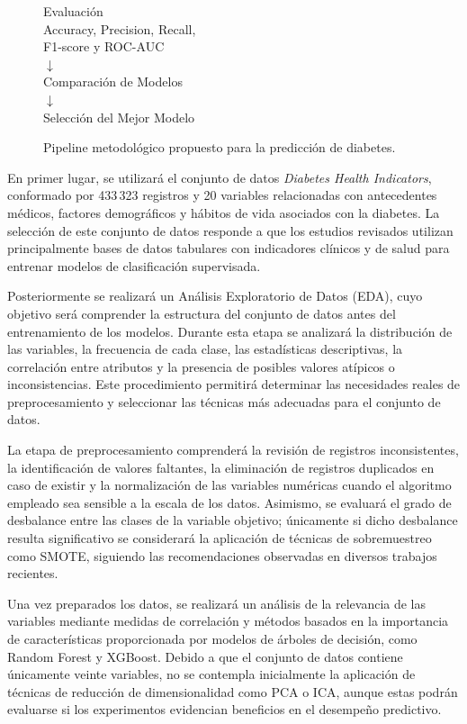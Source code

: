 \documentclass[journal]{IEEEtran}
\begin{document}
\begin{figure}[ht]
{\begin{minipage}{0.47\textwidth}
Evaluación\\
Accuracy, Precision, Recall,\\
F1-score y ROC-AUC\\
$\downarrow$\\[0.2cm]
 
Comparación de Modelos\\
$\downarrow$\\[0.2cm]
 
Selección del Mejor Modelo
\end{minipage}
}
\caption{Pipeline metodológico propuesto para la predicción de diabetes.}
\label{fig:pipeline}
\end{figure}

En primer lugar, se utilizará el conjunto de datos \textit{Diabetes Health Indicators}, conformado por 433\,323 registros y 20 variables relacionadas con antecedentes médicos, factores demográficos y hábitos de vida asociados con la diabetes. La selección de este conjunto de datos responde a que los estudios revisados utilizan principalmente bases de datos tabulares con indicadores clínicos y de salud para entrenar modelos de clasificación supervisada.

Posteriormente se realizará un Análisis Exploratorio de Datos (EDA), cuyo objetivo será comprender la estructura del conjunto de datos antes del entrenamiento de los modelos. Durante esta etapa se analizará la distribución de las variables, la frecuencia de cada clase, las estadísticas descriptivas, la correlación entre atributos y la presencia de posibles valores atípicos o inconsistencias. Este procedimiento permitirá determinar las necesidades reales de preprocesamiento y seleccionar las técnicas más adecuadas para el conjunto de datos.

La etapa de preprocesamiento comprenderá la revisión de registros inconsistentes, la identificación de valores faltantes, la eliminación de registros duplicados en caso de existir y la normalización de las variables numéricas cuando el algoritmo empleado sea sensible a la escala de los datos. Asimismo, se evaluará el grado de desbalance entre las clases de la variable objetivo; únicamente si dicho desbalance resulta significativo se considerará la aplicación de técnicas de sobremuestreo como SMOTE, siguiendo las recomendaciones observadas en diversos trabajos recientes.

Una vez preparados los datos, se realizará un análisis de la relevancia de las variables mediante medidas de correlación y métodos basados en la importancia de características proporcionada por modelos de árboles de decisión, como Random Forest y XGBoost. Debido a que el conjunto de datos contiene únicamente veinte variables, no se contempla inicialmente la aplicación de técnicas de reducción de dimensionalidad como PCA o ICA, aunque estas podrán evaluarse si los experimentos evidencian beneficios en el desempeño predictivo.
\end{document}
